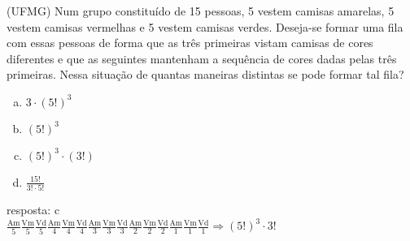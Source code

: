 \begin{ex}
 (UFMG) Num grupo constituído de 15 pessoas, 5 vestem camisas amarelas, 5 vestem camisas vermelhas e 5 vestem camisas verdes. Deseja-se formar uma fila com essas pessoas de forma que as três primeiras vistam camisas de cores diferentes e que as seguintes mantenham a sequência de cores dadas pelas três primeiras. Nessa situação de quantas maneiras distintas se pode formar tal fila?
    \begin{enumerate}[(a)]
    \item $3\cdot (5!) ^3 $
    \item $(5!)^3$
    \item $(5!)^3\cdot(3!)$
    \item $\frac{15!}{3!\cdot5!}$
    \end{enumerate}
      \begin{sol}
        resposta: c \\
        $\frac{\mathrm{Am}}{5}\frac{\mathrm{Vm}}{5}\frac{\mathrm{Vd}}{5}
        \frac{\mathrm{Am}}{4}\frac{\mathrm{Vm}}{4}\frac{\mathrm{Vd}}{4}
        \frac{\mathrm{Am}}{3}\frac{\mathrm{Vm}}{3}\frac{\mathrm{Vd}}{3}
        \frac{\mathrm{Am}}{2}\frac{\mathrm{Vm}}{2}\frac{\mathrm{Vd}}{2}
        \frac{\mathrm{Am}}{1}\frac{\mathrm{Vm}}{1}\frac{\mathrm{Vd}}{1}\Longrightarrow (5!)^3\cdot3!$
        
      \end{sol}
\end{ex}